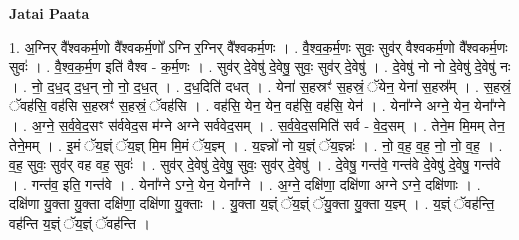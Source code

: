 \documentclass[17pt]{extarticle}
\begin{document}
\textbf{Jatai Paata} \newline

1. अ॒ग्निर् वै᳚श्वकर्म॒णो वै᳚श्वकर्म॒णो᳚ ऽग्नि र॒ग्निर् वै᳚श्वकर्म॒णः । . वै॒श्व॒क॒र्म॒णः सुवः॒ सुव॑र् वैश्वकर्म॒णो वै᳚श्वकर्म॒णः सुवः॑ । . वै॒श्व॒क॒र्म॒ण इति॑ वैश्व - क॒र्म॒णः । . सुव॑र् दे॒वेषु॑ दे॒वेषु॒ सुवः॒ सुव॑र् दे॒वेषु॑ । . दे॒वेषु॑ नो नो दे॒वेषु॑ दे॒वेषु॑ नः । . नो॒ द॒ध॒द् द॒ध॒न् नो॒ नो॒ द॒ध॒त् । . द॒ध॒दिति॑ दधत् । . येना॑ स॒हस्रꣳ॑ स॒हस्रं॒ ॅयेन॒ येना॑ स॒हस्र᳚म् । . स॒हस्रं॒ ॅवह॑सि॒ वह॑सि स॒हस्रꣳ॑ स॒हस्रं॒ ॅवह॑सि । . वह॑सि॒ येन॒ येन॒ वह॑सि॒ वह॑सि॒ येन॑ । . येना᳚ग्ने अग्ने॒ येन॒ येना᳚ग्ने । . अ॒ग्ने॒ स॒र्व॒वे॒द॒सꣳ स॑र्ववेद॒स म॑ग्ने अग्ने सर्ववेद॒सम् । . स॒र्व॒वे॒द॒समिति॑ सर्व - वे॒द॒सम् । . तेने॒म मि॒मम् तेन॒ तेने॒मम् । . इ॒मं ॅय॒ज्ञ्ं ॅय॒ज्ञ् मि॒म मि॒मं ॅय॒ज्ञ्म् । . य॒ज्ञ्न्नो॑ नो य॒ज्ञ्ं ॅय॒ज्ञ्न्नः॑ । . नो॒ व॒ह॒ व॒ह॒ नो॒ नो॒ व॒ह॒ । . व॒ह॒ सुवः॒ सुव॑र् वह वह॒ सुवः॑ । . सुव॑र् दे॒वेषु॑ दे॒वेषु॒ सुवः॒ सुव॑र् दे॒वेषु॑ । . दे॒वेषु॒ गन्त॑वे॒ गन्त॑वे दे॒वेषु॑ दे॒वेषु॒ गन्त॑वे । . गन्त॑व॒ इति॒ गन्त॑वे । . येना᳚ग्ने ऽग्ने॒ येन॒ येना᳚ग्ने । . अ॒ग्ने॒ दक्षि॑णा॒ दक्षि॑णा अग्ने ऽग्ने॒ दक्षि॑णाः । . दक्षि॑णा यु॒क्ता यु॒क्ता दक्षि॑णा॒ दक्षि॑णा यु॒क्ताः । . यु॒क्ता य॒ज्ञ्ं ॅय॒ज्ञ्ं ॅयु॒क्ता यु॒क्ता य॒ज्ञ्म् । . य॒ज्ञ्ं ॅवह॑न्ति॒ वह॑न्ति य॒ज्ञ्ं ॅय॒ज्ञ्ं ॅवह॑न्ति । \newline
\end{document}
